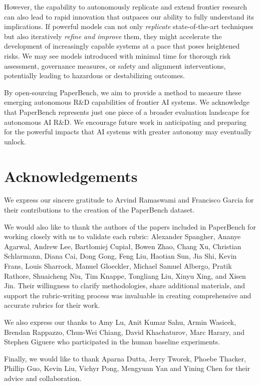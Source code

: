 \documentclass{article}
\theoremstyle{plain}
\theoremstyle{definition}
\theoremstyle{remark}
\begin{document}
However, the capability to autonomously replicate and extend frontier research can also lead to rapid innovation that outpaces our ability to fully understand its implications. If powerful models can not only \textit{replicate} state-of-the-art techniques but also iteratively \textit{refine and improve} them, they might accelerate the development of increasingly capable systems at a pace that poses heightened risks. We may see models introduced with minimal time for thorough risk assessment, governance measures, or safety and alignment interventions, potentially leading to hazardous or destabilizing outcomes.

By open-sourcing PaperBench, we aim to provide a method to measure these emerging autonomous R\&D capabilities of frontier AI systems. We acknowledge that PaperBench represents just one piece of a broader evaluation landscape for autonomous AI R\&D. We encourage future work in anticipating and preparing for the powerful impacts that AI systems with greater autonomy may eventually unlock.

\section*{Acknowledgements}

We express our sincere gratitude to Arvind Ramaswami and Francisco Garcia for their contributions to the creation of the PaperBench dataset.

We would also like to thank the authors of the papers included in PaperBench for working closely with us to validate each rubric: Alexander Spangher, Ananye Agarwal, Andrew Lee, Bartłomiej Cupiał, Bowen Zhao, Chang Xu, Christian Schlarmann, Diana Cai, Dong Gong, Feng Liu, Haotian Sun, Jia Shi, Kevin Frans, Louis Sharrock, Manuel Gloeckler, Michael Samuel Albergo, Pratik Rathore, Shuaicheng Niu, Tim Knappe, Tongliang Liu, Xinyu Xing, and Xisen Jin. Their willingness to clarify methodologies, share additional materials, and support the rubric-writing process was invaluable in creating comprehensive and accurate rubrics for their work.

We also express our thanks to Amy Lu, Anit Kumar Sahu, Armin Wasicek, Brendan Rappazzo, Chun-Wei Chiang, David Khachaturov, Marc Harary, and Stephen Giguere who participated in the human baseline experiments.

Finally, we would like to thank Aparna Dutta, Jerry Tworek, Phoebe Thacker, Phillip Guo, Kevin Liu, Vichyr Pong, Mengyuan Yan and Yining Chen for their advice and collaboration.
\end{document}
